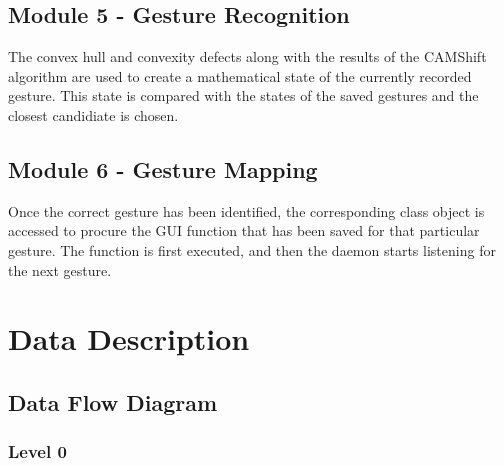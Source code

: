 \documentclass{scrreprt}
\begin{document}
\section{Module 5 - Gesture Recognition}
The convex hull and convexity defects along with the results of the CAMShift algorithm are used to create a mathematical state of the currently recorded gesture. This state is compared with the states of the saved gestures and the closest candidiate is chosen.

\section{Module 6 - Gesture Mapping}
Once the correct gesture has been identified, the corresponding class object is accessed to procure the GUI function that has been saved for that particular gesture. The function is first executed, and then the daemon starts listening for the next gesture.

\chapter{Data Description}

\section{Data Flow Diagram}

\subsection{Level 0}
\end{document}
